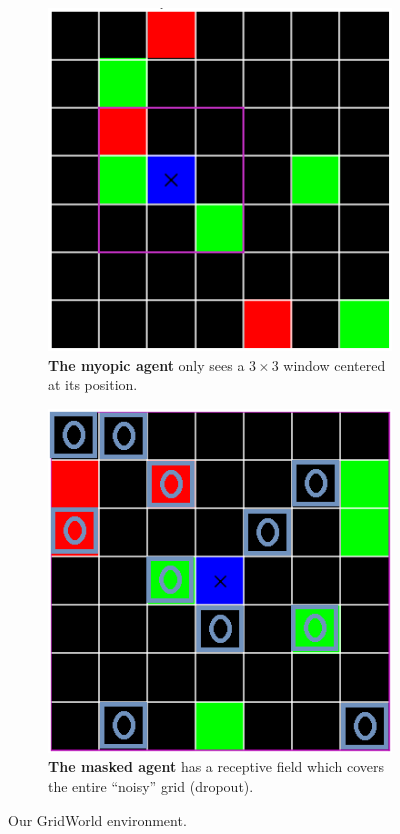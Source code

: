 \documentclass{article} %
\begin{document}
	\begin{figure}
		
		\begin{subfigure}[b]{.45\linewidth}
			\centering
			\includegraphics[width=0.9\linewidth]{imgs/myopic.png}
			\caption{\textbf{The myopic agent} only sees a $3\times3$ window centered at its position.}
			\label{myopic}
		\end{subfigure}
		\begin{subfigure}[b]{.45\linewidth}
			\centering
			\includegraphics[width=0.9\linewidth]{imgs/masked.png}
			\caption{\textbf{The masked agent} has a receptive field which covers the entire ``noisy'' grid (dropout).}
			\label{masked}
		\end{subfigure}
		\caption{Our GridWorld environment.}
		\label{grid}
	\end{figure}
	
\end{document}
